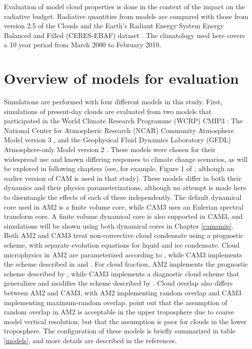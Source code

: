 Evaluation of model cloud properties is done in the context of the impact on the radiative budget. Radiative quantities from models are compared with those from version 2.5 of the Clouds and the Earth's Radiant Energy System Energy Balanced and Filled (CERES-EBAF) dataset \citep{loeb_et_al_2009}. The climatology used here covers a 10 year period from March 2000 to February 2010.

\section{Overview of models for evaluation}
Simulations are performed with four different models in this study. First, simulations of present-day clouds are evaluated from two models that participated in the World Climate Research Programme (WCRP) CMIP3 \citep{meehl_et_al_2007}: The National Center for Atmospheric Research (NCAR) Community Atmosphere Model version 3 \citep[CAM3;][]{cam3_description}, and the Geophysical Fluid Dynamics Laboratory (GFDL) Atmosphere-only Model version 2 \citep[AM2;][]{am2_evaluation}. These models were chosen for their widespread use and known differing responses to climate change scenarios, as will be explored in following chapters (see, for example, Figure 1 of \cite{stephens_2005}, although an earlier version of CAM is used in that study). These models differ in both their dynamics and their physics parameterizations, although no attempt is made here to disentangle the effects of each of these independently. The default dynamical core used in AM2 is a finite volume core, while CAM3 uses an Eulerian spectral transform core. A finite volume dynamical core is also supported in CAM3, and simulations will be shown using both dynamical cores in Chapter \ref{camamip}. Both AM2 and CAM3 treat non-convective cloud condensate using a prognostic scheme, with separate evolution equations for liquid and ice condensate. Cloud microphysics in AM2 are parameterized according to \cite{rotstayn_1997}, while CAM3 implements the scheme described in \cite{rasch_and_kristjansson_1998} and \cite{zhang_et_al_2003}. For cloud fraction, AM2 implements the prognostic scheme described by \cite{tiedtke_1993}, while CAM3 implements a diagnostic cloud scheme that generalizes and modifies the scheme described by \cite{slingo_1989}. Cloud overlap also differs between AM2 and CAM3, with AM2 implementing random overlap and CAM3 implementing maximum-random overlap. \cite{am2_evaluation} point out that the assumption of random overlap in AM2 is acceptable in the upper troposphere due to coarse model vertical resolution, but that the assumption is poor for clouds in the lower troposphere. The configuration of these models is briefly summarized in table \ref{models}, and more details are described in the references.
